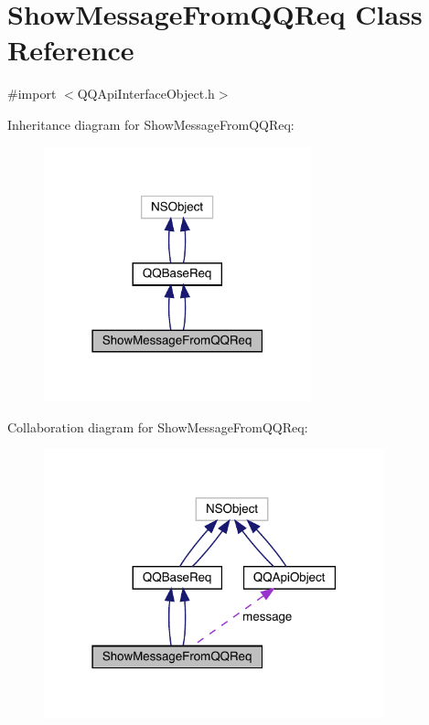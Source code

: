 \hypertarget{interface_show_message_from_q_q_req}{}\section{Show\+Message\+From\+Q\+Q\+Req Class Reference}
\label{interface_show_message_from_q_q_req}


{\ttfamily \#import $<$Q\+Q\+Api\+Interface\+Object.\+h$>$}



Inheritance diagram for Show\+Message\+From\+Q\+Q\+Req\+:\nopagebreak
\begin{figure}[H]
\begin{center}
\leavevmode
\includegraphics[width=219pt]{interface_show_message_from_q_q_req__inherit__graph}
\end{center}
\end{figure}


Collaboration diagram for Show\+Message\+From\+Q\+Q\+Req\+:\nopagebreak
\begin{figure}[H]
\begin{center}
\leavevmode
\includegraphics[width=279pt]{interface_show_message_from_q_q_req__coll__graph}
\end{center}
\end{figure}
